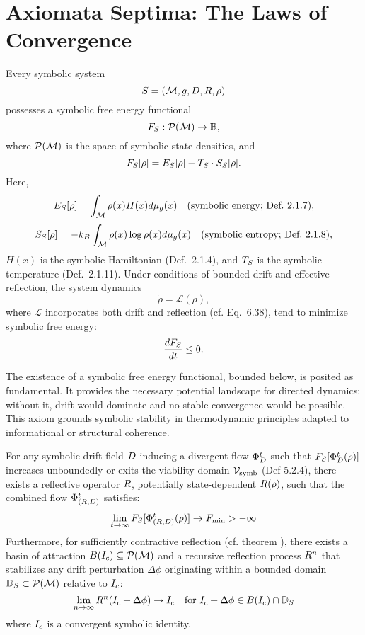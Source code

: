 \section{Axiomata Septima: The Laws of Convergence}
\label{sec:bk7_axiomata_septima_the_laws_of_convergence}
\begin{axiom}
\label{axiom:bk7_convergence_potential}
Every symbolic system 
\[
S = (\mathcal{M}, g, D, R, \rho)
\]
possesses a symbolic free energy functional
\[
F_S : \mathcal{P}(\mathcal{M}) \to \mathbb{R},
\]
where \( \mathcal{P}(\mathcal{M}) \) is the space of symbolic state densities, and
\[
F_S[\rho] = E_S[\rho] - T_S \cdot S_S[\rho].
\]
Here,
\[
E_S[\rho] = \int_{\mathcal{M}} \rho(x) H(x) d\mu_{g}(x)
\quad \text{(symbolic energy; Def.~2.1.7)},
\]
\[
S_S[\rho] = -k_B \int_{\mathcal{M}} \rho(x) \log \rho(x) d\mu_{g}(x)
\quad \text{(symbolic entropy; Def.~2.1.8)},
\]
\( H(x) \) is the symbolic Hamiltonian (Def.~2.1.4), and \( T_S \) is the symbolic temperature (Def.~2.1.11).
Under conditions of bounded drift and effective reflection, the system dynamics
\[
\dot{\rho} = \mathcal{L}(\rho),
\]
where \( \mathcal{L} \) incorporates both drift and reflection (cf. Eq.~6.38), tend to minimize symbolic free energy:
\[
\frac{dF_S}{dt} \le 0.
\]
\end{axiom}
\begin{remark}
\label{remark:bk7_unnamed_remark_01}
The existence of a symbolic free energy functional, bounded below, is posited as fundamental. It provides the necessary potential landscape for directed dynamics; without it, drift would dominate and no stable convergence would be possible. This axiom grounds symbolic stability in thermodynamic principles adapted to informational or structural coherence.
\end{remark}
\begin{axiom}
\label{axiom:bk7_reflective_stabilization}
For any symbolic drift field \(D\) inducing a divergent flow \(\Phi_{D}^t\) such that \(F_S[\Phi_{D}^t(\rho)]\) increases unboundedly or exits the viability domain \(\mathcal{V}_{\mathrm{symb}}\) (Def 5.2.4), there exists a reflective operator \(R\), potentially state-dependent \(R(\rho)\), such that the combined flow \(\Phi_{(R,D)}^t\) satisfies:
\[
\lim_{t\to\infty} F_S[\Phi_{(R,D)}^t(\rho)] \to F_{\min} > -\infty
\]
Furthermore, for sufficiently contractive reflection (cf. theorem ), there exists a basin of attraction \(B(I_c) \subseteq \mathcal{P}(\mathcal{M})\) and a recursive reflection process \(R^n\) that stabilizes any drift perturbation \(\Delta \phi\) originating within a bounded domain \(\mathbb{D}_S \subset \mathcal{P}(\mathcal{M})\) relative to \(I_c\):
\[
\lim_{n\to\infty} R^n(I_c + \Delta \phi) \to I_c \quad \text{for } I_c + \Delta \phi \in B(I_c) \cap \mathbb{D}_S
\]
where \(I_c\) is a convergent symbolic identity.
\end{axiom}
